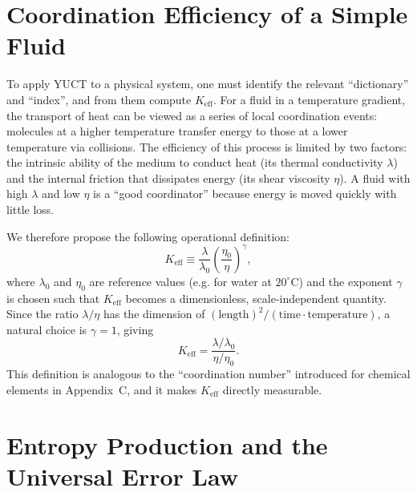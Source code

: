 \documentclass[12pt,a4paper]{article}
\begin{document}
	\section{Coordination Efficiency of a Simple Fluid}
	
	To apply YUCT to a physical system, one must identify the relevant ``dictionary'' and ``index'', and from them compute \(K_{\mathrm{eff}}\).  For a fluid in a temperature gradient, the transport of heat can be viewed as a series of local coordination events: molecules at a higher temperature transfer energy to those at a lower temperature via collisions.  The efficiency of this process is limited by two factors: the intrinsic ability of the medium to conduct heat (its thermal conductivity \(\lambda\)) and the internal friction that dissipates energy (its shear viscosity \(\eta\)).  A fluid with high \(\lambda\) and low \(\eta\) is a ``good coordinator'' because energy is moved quickly with little loss.
	
	We therefore propose the following operational definition:
	\begin{equation}\label{eq:Keff-fluid}
		K_{\mathrm{eff}} \equiv \frac{\lambda}{\lambda_0} \left( \frac{\eta_0}{\eta} \right)^{\gamma},
	\end{equation}
	where \(\lambda_0\) and \(\eta_0\) are reference values (e.g. for water at $20^\circ$C) and the exponent \(\gamma\) is chosen such that \(K_{\mathrm{eff}}\) becomes a dimensionless, scale‑independent quantity.  Since the ratio \(\lambda/\eta\) has the dimension of \((\mathrm{length})^2/(\mathrm{time}\cdot\mathrm{temperature})\), a natural choice is \(\gamma = 1\), giving
	\begin{equation}\label{eq:Keff-fluid2}
		K_{\mathrm{eff}} = \frac{\lambda / \lambda_0}{\eta / \eta_0}.
	\end{equation}
	This definition is analogous to the ``coordination number'' introduced for chemical elements in Appendix~C, and it makes \(K_{\mathrm{eff}}\) directly measurable.
	
	\section{Entropy Production and the Universal Error Law}
	
\end{document}
